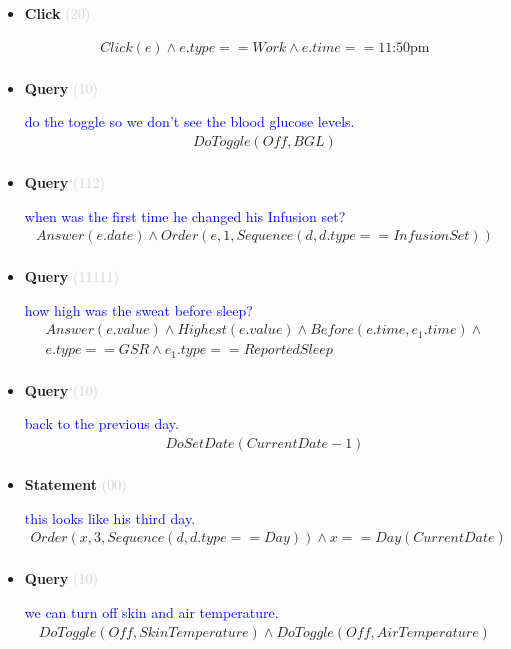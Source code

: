 \documentclass[11pt]{article}
\newcommand{\key}[1]{\textcolor{lightgray}{#1}}
\newcounter{CQuery}
\newcounter{CStatement}
\newcounter{CClick}
\begin{document}
\begin{itemize}
\item
\textbf{Click\theCClick} \key{(20)} \addtocounter{CClick}{1}
\textcolor{blue}{  }
\begin{multline*}
Click(e) \wedge e.type==Work \wedge e.time==\mbox{11:50pm} \\ 
\end{multline*}


\item
\textbf{Query\theCQuery} \key{(10)} \addtocounter{CQuery}{1}
\textcolor{blue}{ do the toggle so we don't see the blood glucose levels. }
\begin{multline*}
DoToggle(Off, BGL) \\ 
\end{multline*}


\item
\textbf{Query\theCQuery} \key{(112)} \addtocounter{CQuery}{1}
\textcolor{blue}{ when was the first time he changed his Infusion set? }
\begin{multline*}
Answer(e.date) \wedge Order(e, 1, Sequence(d, d.type==InfusionSet)) \\ 
\end{multline*}


\item
\textbf{Query\theCQuery} \key{(11111)} \addtocounter{CQuery}{1}
\textcolor{blue}{ how high was the sweat before sleep? }
\begin{multline*}
Answer(e.value) \wedge Highest(e.value) \wedge Before(e.time, e_1.time) \wedge \\ 
e.type==GSR \wedge e_1.type==ReportedSleep \\ 
\end{multline*}


\item
\textbf{Query\theCQuery} \key{(10)} \addtocounter{CQuery}{1}
\textcolor{blue}{ back to the previous day. }
\begin{multline*}
DoSetDate(CurrentDate - 1) \\ 
\end{multline*}


\item
\textbf{Statement\theCStatement} \key{(00)} \addtocounter{CStatement}{1}
\textcolor{blue}{ this looks like his third day. }
\begin{multline*}
Order(x, 3, Sequence(d, d.type==Day)) \wedge x==Day(CurrentDate) \\ 
\end{multline*}


\item
\textbf{Query\theCQuery} \key{(10)} \addtocounter{CQuery}{1}
\textcolor{blue}{ we can turn off skin and air temperature. }
\begin{multline*}
DoToggle(Off, SkinTemperature) \wedge DoToggle(Off, AirTemperature) \\ 
\end{multline*}



\end{itemize}
\end{document}
